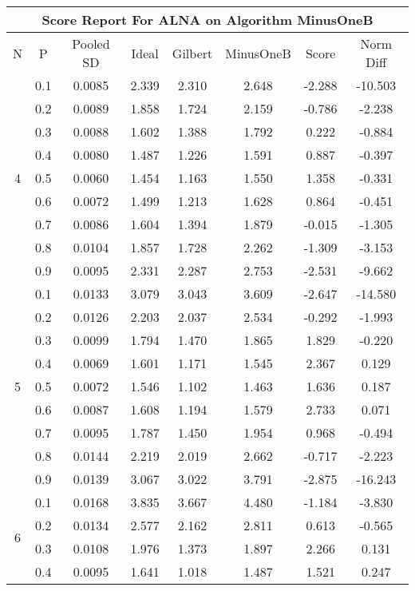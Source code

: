 \documentclass[11pt,a4paper]{report}
\begin{document}
\begin{longtable}{ | c | c || c | c | c | c | c | c | }
\hline
\multicolumn{8}{|c|}{ Score Report For ALNA on Algorithm MinusOneB} \\
\hline
N & P & Pooled SD &  Ideal &  Gilbert & MinusOneB  & Score & Norm Diff \\
 \hline
 \hline
 \endhead
\multirow{9}{*}{4} & 0.1 & 0.0085 & 2.339 & 2.310 & 2.648 & -2.288 & -10.503 \\
 & 0.2 & 0.0089 & 1.858 & 1.724 & 2.159 & -0.786 & -2.238 \\
 & 0.3 & 0.0088 & 1.602 & 1.388 & 1.792 & 0.222 & -0.884 \\
 & 0.4 & 0.0080 & 1.487 & 1.226 & 1.591 & 0.887 & -0.397 \\
 & 0.5 & 0.0060 & 1.454 & 1.163 & 1.550 & 1.358 & -0.331 \\
 & 0.6 & 0.0072 & 1.499 & 1.213 & 1.628 & 0.864 & -0.451 \\
 & 0.7 & 0.0086 & 1.604 & 1.394 & 1.879 & -0.015 & -1.305 \\
 & 0.8 & 0.0104 & 1.857 & 1.728 & 2.262 & -1.309 & -3.153 \\
 & 0.9 & 0.0095 & 2.331 & 2.287 & 2.753 & -2.531 & -9.662 \\
 \hline
\multirow{9}{*}{5} & 0.1 & 0.0133 & 3.079 & 3.043 & 3.609 & -2.647 & -14.580 \\
 & 0.2 & 0.0126 & 2.203 & 2.037 & 2.534 & -0.292 & -1.993 \\
 & 0.3 & 0.0099 & 1.794 & 1.470 & 1.865 & 1.829 & -0.220 \\
 & 0.4 & 0.0069 & 1.601 & 1.171 & 1.545 & 2.367 & 0.129 \\
 & 0.5 & 0.0072 & 1.546 & 1.102 & 1.463 & 1.636 & 0.187 \\
 & 0.6 & 0.0087 & 1.608 & 1.194 & 1.579 & 2.733 & 0.071 \\
 & 0.7 & 0.0095 & 1.787 & 1.450 & 1.954 & 0.968 & -0.494 \\
 & 0.8 & 0.0144 & 2.219 & 2.019 & 2.662 & -0.717 & -2.223 \\
 & 0.9 & 0.0139 & 3.067 & 3.022 & 3.791 & -2.875 & -16.243 \\
 \hline
\multirow{9}{*}{6} & 0.1 & 0.0168 & 3.835 & 3.667 & 4.480 & -1.184 & -3.830 \\
 & 0.2 & 0.0134 & 2.577 & 2.162 & 2.811 & 0.613 & -0.565 \\
 & 0.3 & 0.0108 & 1.976 & 1.373 & 1.897 & 2.266 & 0.131 \\
 & 0.4 & 0.0095 & 1.641 & 1.018 & 1.487 & 1.521 & 0.247 \\

\end{longtable}
\end{document}
